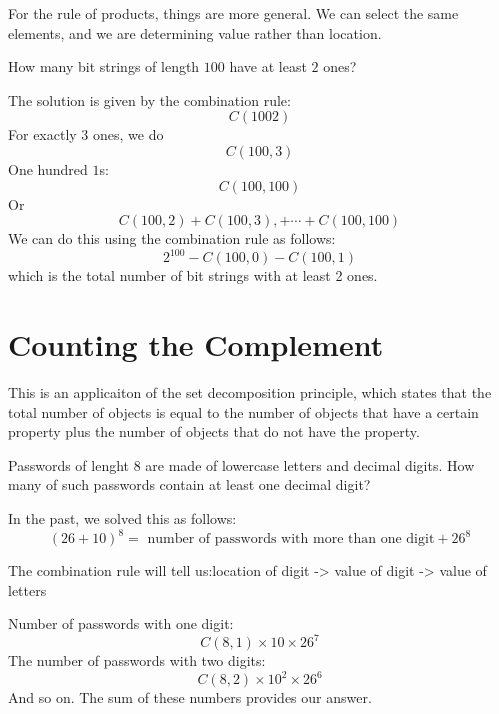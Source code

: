 For the rule of products, things are more general. We can select the same
elements, and we are determining value rather than location.

\begin{ex}
  How many bit strings of length $100$ have at least $2$ ones?
  \begin{sol}
    The solution is given by the combination rule:
    \[ C(100 2) \]
    For exactly 3 ones, we do
    \[ C(100, 3) \]
    One hundred $1$s:
    \[ C(100,100) \]
    Or
    \[ C(100, 2) + C(100, 3),+ \cdots + C(100,100) \]
    We can do this using the combination rule as follows:
    \[ 2^{100} - C(100,0) - C(100,1) \]
    which is the total number of bit strings with at least 2 ones.
  \end{sol}
\end{ex}

\section{Counting the Complement}

This is an applicaiton of the set decomposition principle, which states that the
total number of objects is equal to the number of objects that have a certain
property plus the number of objects that do not have the property.
\begin{ex}
  Passwords of lenght 8 are made of lowercase letters and decimal digits. How
  many of such passwords contain at least one decimal digit?
  
  In the past, we solved this as follows:
  \[ (26+10)^8 = \text{ number of passwords with more than one digit} + 26^8 \]

  The combination rule will tell us:location of digit -> value of digit ->
  value of letters


  Number of passwords with one digit:
  \[ C(8,1) \times 10 \times 26^7 \]
  The number of passwords with two digits:
  \[ C(8,2)\times10^2\times26^6 \]
  And so on. The sum of these numbers provides our answer.
\end{ex}

